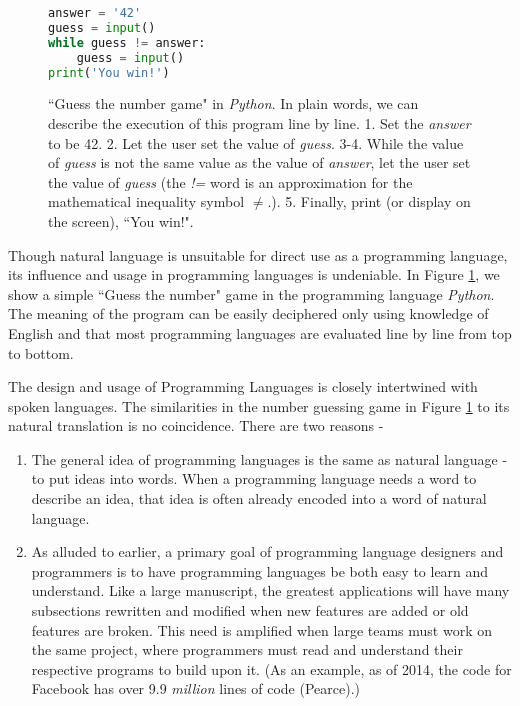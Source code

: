 \documentclass[12pt]{article}
\begin{document}
\begin{flushleft}
\begin{figure}[h]
\centering
\caption{
``Guess the number game" in \textit{Python}.
In plain words, we can describe the execution of this
program line by line.
1. Set the \textit{answer} to be 42.
2. Let the user set the value of \textit{guess}.
3-4. While the value of \textit{guess} is not the same value
as the value of \textit{answer},
let the user set the value of \textit{guess} (the \textit{!=} word is an approximation
for the mathematical inequality symbol $\neq$.).
5. Finally, print (or display on the screen), ``You win!".
}
\begin{lstlisting}[language=Python]
answer = '42'
guess = input()
while guess != answer:
    guess = input()
print('You win!')
\end{lstlisting}
\label{fig:guess_number}
\end{figure}

Though natural language is unsuitable for direct use as a programming
language, its influence and usage in programming languages is undeniable.
In Figure \ref{fig:guess_number}, we show a simple ``Guess the number" game
in the programming language \textit{Python}.
The meaning of the program can be easily deciphered only using knowledge
of English and that most programming languages are evaluated line
by line from top to bottom.

The design and usage of Programming Languages is closely intertwined with spoken languages.
The similarities in the number guessing game in Figure \ref{fig:guess_number}
to its natural translation is no coincidence.
There are two reasons -
\begin{enumerate}
\item The general idea of programming languages is the same as natural
language - to put ideas into words. When a programming language needs
a word to describe an idea, that idea is often already encoded into
a word of natural language.
\item As alluded to earlier, a primary goal of programming language
designers and programmers is to have programming languages be both easy to
learn and understand. Like a large manuscript, the greatest applications
will have many subsections rewritten and modified when new features are
added or old features are broken. This need is amplified when large
teams must work on the same project, where programmers must read and
understand their respective programs to build upon it.
(As an example, as of 2014, the code
for Facebook has over 9.9 \textit{million} lines of code (Pearce).)


\end{enumerate}
\end{flushleft}
\end{document}
